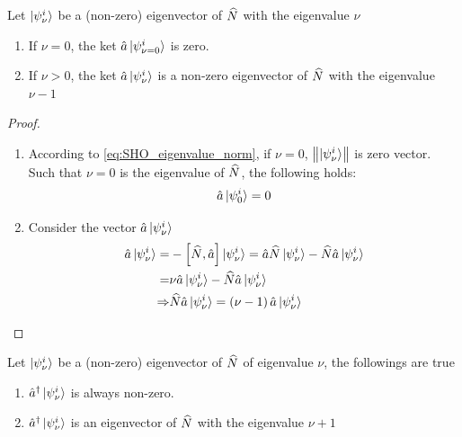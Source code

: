 \begin{lemma} \label{lemma:annihilation_properties}
    Let $\ket{\psi_ \nu^i}$ be a (non-zero) eigenvector of $\widehat{N}$ with the eigenvalue $\nu$ 
    \begin{enumerate}
        \item If $ \nu = 0$, the ket $\hat{a} \ket{\psi_{\nu=0}^i}$ is zero. 
        \item If $ \nu > 0$, the ket $\hat{a} \ket{\psi_ \nu^i}$ is a non-zero eigenvector of $\widehat{N}$ with the eigenvalue $ \nu -1 $
    \end{enumerate}
\end{lemma}

\begin{proof}
    \begin{enumerate}
        \item According to \cref{eq:SHO_eigenvalue_norm}, if $ \nu=0$, $\left\lVert \ket{\psi_ \nu^i} \right\rVert$ is zero vector. Such that $\nu =0 $ is the eigenvalue of $\widehat{N}$, the following holds:
        \begin{eqnarray}
            \hat{a} \ket{\psi_0^i} = 0
        \end{eqnarray}
        \item Consider the vector $\hat{a} \ket{\psi_ \nu^i}$
        \begin{align}
            \hat{a} \ket{\psi_ \nu^i} =& - \left[ \widehat{N} , \hat{a} \right] \ket{\psi_ \nu^i} = \hat{a} \widehat{N} \ket{\psi_ \nu^i} - \widehat{N} \hat{a} \ket{\psi_ \nu^i} \notag \\
            =&  \nu \hat{a} \ket{\psi_ \nu^i} - \widehat{N} \hat{a} \ket{\psi_ \nu^i} \notag \\
            \Rightarrow& \widehat{N} \hat{a} \ket{\psi_ \nu^i} = \left( \nu - 1\right) \hat{a} \ket{\psi_ \nu^i}
        \end{align}
    \end{enumerate}
\end{proof}

\begin{lemma} \label{lemma:creation_properties}
    Let $\ket{\psi_ \nu^i}$ be a (non-zero) eigenvector of $\widehat{N}$ of eigenvalue $\nu$, the followings are true 
    \begin{enumerate}
        \item $\hat{a}^ \dag \ket{\psi_ \nu^i}$ is always non-zero. 
        \item $\hat{a}^ \dag \ket{\psi_ \nu^i}$ is an eigenvector of $\widehat{N}$ with the eigenvalue $\nu + 1$
    \end{enumerate}
\end{lemma}

